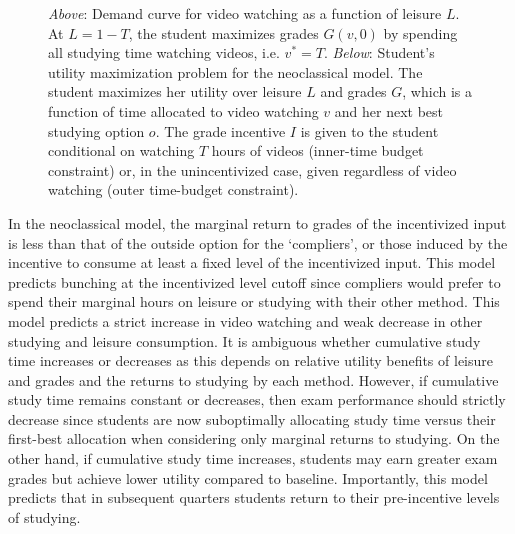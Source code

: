 \documentclass[12pt]{article}
\begin{document}
\begin{figure}
\begin{center}

	\caption{\textit{Above}: Demand curve for video watching as a function of leisure $L$. At $L=1-T$, the student maximizes grades $G(v,0)$ by spending all studying time watching videos, i.e. $v^*=T$. \textit{Below}: Student's utility maximization problem for the neoclassical model. The student maximizes her utility over leisure $L$ and grades $G$, which is a function of time allocated to video watching $v$ and her next best studying option $o$. The grade incentive $I$ is given to the student conditional on watching $T$ hours of videos (inner-time budget constraint) or, in the unincentivized case, given regardless of video watching (outer time-budget constraint).}
\end{center}
\end{figure}

In the neoclassical model, the marginal return to grades of the incentivized input is less than that of the outside option for the `compliers', or those induced by the incentive to consume at least a fixed level of the incentivized input. This model predicts bunching at the incentivized level cutoff since compliers would prefer to spend their marginal hours on leisure or studying with their other method. This model predicts a strict increase in video watching and weak decrease in other studying and leisure consumption. It is ambiguous whether cumulative study time increases or decreases as this depends on relative utility benefits of leisure and grades and the returns to studying by each method. However, if cumulative study time remains constant or decreases, then exam performance should strictly decrease since students are now suboptimally allocating study time versus their first-best allocation when considering only marginal returns to studying. On the other hand, if cumulative study time increases, students may earn greater exam grades but achieve lower utility compared to baseline. Importantly, this model predicts that in subsequent quarters students return to their pre-incentive levels of studying.
\end{document}
